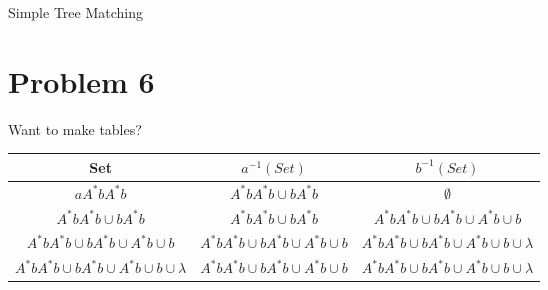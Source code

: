 \documentclass[12pt,letterpaper]{article}
\begin{document}
\begin{algorithm}[h]
\caption{\label{alg:sta}Simple Tree Matching}


\end{algorithm}

\newpage
\section*{Problem 6}

Want to make tables?

\begin{center}
    \begin{tabular}{ | c | c | c |}
    \hline
    Set & $a^{-1}(Set)$ & $b^{-1}(Set)$ \\ 
    \hline 
    \hline
    $aA^*bA^*b$ & $A^*bA^*b \cup bA^*b$ & $\emptyset$ \\ 
    \hline
    $A^*bA^*b \cup bA^*b$ & $A^*bA^*b \cup bA^*b$ & $A^*bA^*b \cup bA^*b \cup
    A^*b \cup b$ \\ 
    \hline 
    $A^*bA^*b \cup bA^*b \cup A^*b \cup b$ & 
    $A^*bA^*b \cup bA^*b \cup A^*b \cup b$ &
    $A^*bA^*b \cup bA^*b \cup A^*b \cup b \cup \lambda$ \\
    \hline 
    $A^*bA^*b \cup bA^*b \cup A^*b \cup b \cup \lambda$ & 
    $A^*bA^*b \cup bA^*b \cup A^*b \cup b$ &
    $A^*bA^*b \cup bA^*b \cup A^*b \cup b \cup \lambda$ \\
    
    \hline
    \end{tabular}
\end{center}
\end{document}
